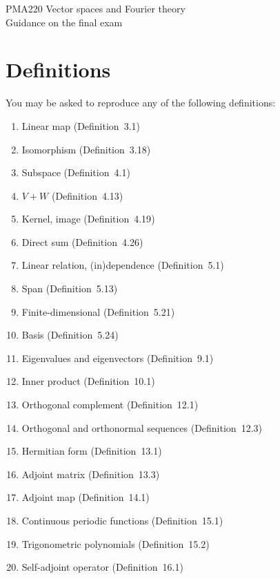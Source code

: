 \documentclass{amsart}
\renewcommand{\:}{\colon}
\begin{document}
\begin{center}\Large
 PMA220 Vector spaces and Fourier theory\\
 Guidance on the final exam
\end{center}
\vspace{4ex}

\section*{Definitions}

You may be asked to reproduce any of the following
definitions:
\begin{enumerate}
 \item Linear map (Definition~{3.1})
 \item Isomorphism (Definition~{3.18})
 \item Subspace (Definition~{4.1})
 \item $V+W$ (Definition~{4.13})
 \item Kernel, image (Definition~{4.19})
 \item Direct sum (Definition~{4.26})
 \item Linear relation, (in)dependence (Definition~{5.1})
 \item Span (Definition~{5.13})
 \item Finite-dimensional (Definition~{5.21})
 \item Basis (Definition~{5.24})
 \item Eigenvalues and eigenvectors (Definition~{9.1})
 \item Inner product (Definition~{10.1})
 \item Orthogonal complement (Definition~{12.1})
 \item Orthogonal and orthonormal sequences
  (Definition~{12.3})
 \item Hermitian form (Definition~{13.1})
 \item Adjoint matrix (Definition~{13.3})
 \item Adjoint map (Definition~{14.1})
 \item Continuous periodic functions (Definition~{15.1})
 \item Trigonometric polynomials (Definition~{15.2})
 \item Self-adjoint operator (Definition~{16.1})
\end{enumerate}
\end{document}
